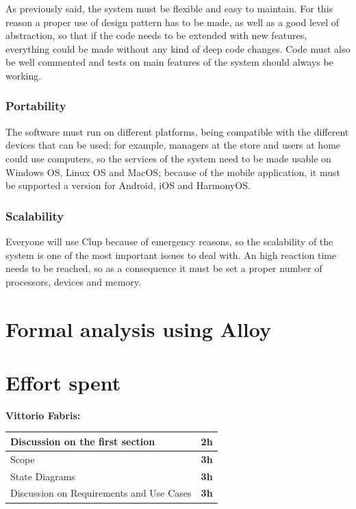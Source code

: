 \documentclass[]{article}
\begin{document}
			As previously said, the system must be flexible and easy to maintain. For this reason a proper use of design pattern has to be made, as well as a good level of abstraction, so that if the code needs to be extended with new features, everything could be made without any kind of deep code changes. Code must also be well commented and tests on main features of the system should always be working.\\
			
			\subsubsection{Portability}

			The software must run on different platforms, being compatible with the different devices that can be used: for example, managers at the store and users at home could use computers, so the services of the system need to be made usable on Windows OS, Linux OS and MacOS; because of the mobile application, it must be supported a version for Android, iOS and HarmonyOS.\\
			
			\subsubsection{Scalability}

			Everyone will use Clup because of emergency reasons, so the scalability of the system is one of the most important issues to deal with. An high reaction time needs to be reached, so as a consequence it must be set a proper number of processors, devices and memory.\\




		
	\section{Formal analysis using Alloy}
	
	\newpage
	
	\section{Effort spent}

	\textbf{\large Vittorio Fabris:} \\ \newline
		\begin{tabular}{|l|c|}
			\hline
			Discussion on the first section &  \textbf{2h} \\ \hline
			\rowcolor[HTML]{DCDCDC} 
			Scope & \textbf{3h} \\ \hline
			State Diagrams & \textbf{3h} \\ \hline
			\rowcolor[HTML]{DCDCDC} 
			Discussion on Requirements and Use Cases & \textbf{3h} \\ \hline
		\end{tabular}
		
\end{document}
